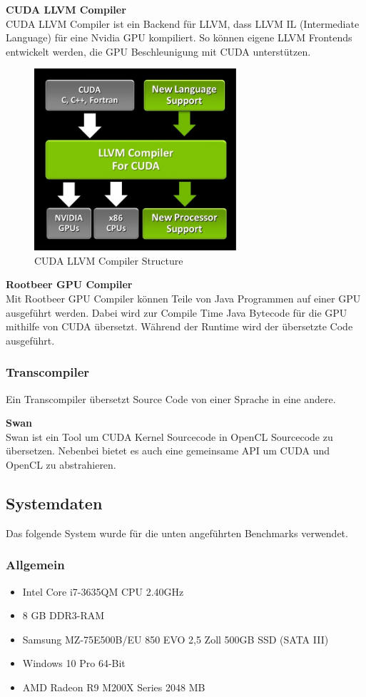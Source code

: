 \newpage

\textbf{CUDA LLVM Compiler}\\
CUDA LLVM Compiler ist ein Backend für LLVM, dass LLVM IL (Intermediate Language) für eine Nvidia GPU kompiliert. So können eigene LLVM Frontends entwickelt werden, die GPU Beschleunigung mit CUDA unterstützen.

\begin{figure}[!h]
	\begin{center}
		\includegraphics[width=7.5cm]{images/LLVM_Compiler_structure.jpg}
		\caption{CUDA LLVM Compiler Structure\cite{cudallvm}}
	\end{center}
\end{figure}

\textbf{Rootbeer GPU Compiler}\\
Mit Rootbeer GPU Compiler können Teile von Java Programmen auf einer GPU ausgeführt werden. Dabei wird zur Compile Time Java Bytecode für die GPU mithilfe von CUDA übersetzt. Während der Runtime wird der übersetzte Code ausgeführt.\cite{rootbeer1}

\subsubsection{Transcompiler}
Ein Transcompiler übersetzt Source Code von einer Sprache in eine andere.

\textbf{Swan}\\
Swan ist ein Tool um CUDA Kernel Sourcecode in OpenCL Sourcecode zu übersetzen. Nebenbei bietet es auch eine gemeinsame API um CUDA und OpenCL zu abstrahieren.\cite{swan}
\newpage
\subsection{Systemdaten}
Das folgende System wurde für die unten angeführten Benchmarks verwendet.
\subsubsection{Allgemein}
\begin{itemize}
\item Intel Core i7-3635QM CPU 2.40GHz
\item 8 GB DDR3-RAM
\item Samsung MZ-75E500B/EU 850 EVO 2,5 Zoll 500GB SSD (SATA III)
\item Windows 10 Pro 64-Bit
\item AMD Radeon R9 M200X Series 2048 MB
\end{itemize}
